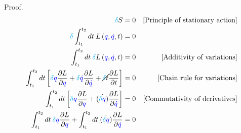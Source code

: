 \documentclass{beamer}
\begin{document}
\begin{frame}
\begin{block}{Proof.}
\begin{align*}
\textcolor{cyan}{\delta} S & = 0 & \left[ \text{Principle of stationary action} \right] \\
\textcolor{cyan}{\delta} \int_{t_1}^{t_2} dt \: L \left( \textcolor{blue}{q}, \textcolor{blue}{\dot{q}}, t \right) & = 0 \\
\int_{t_1}^{t_2} dt \: \textcolor{cyan}{\delta} L \left( \textcolor{blue}{q}, \textcolor{blue}{\dot{q}}, t \right) & = 0 & \left[ \text{Additivity of variations} \right] \\
\int_{t_1}^{t_2} dt \left[  \textcolor{cyan}{\delta} \textcolor{blue}{q} \frac{\partial L}{\partial \textcolor{blue}{q}} + \textcolor{cyan}{\delta} \textcolor{blue}{\dot{q}} \frac{\partial L}{\partial \textcolor{blue}{\dot{q}}} + \cancel{\textcolor{cyan}{\delta} t} \frac{\partial L}{\partial t} \right] & = 0 & \left[ \text{Chain rule for variations} \right] \\
\int_{t_1}^{t_2} dt \left[  \textcolor{cyan}{\delta} \textcolor{blue}{q} \frac{\partial L}{\partial \textcolor{blue}{q}} + \dot{\left( \textcolor{cyan}{\delta} \textcolor{blue}{{q}}\right)} \frac{\partial L}{\partial \textcolor{blue}{\dot{q}}} \right] & = 0 & \left[ \text{Commutativity of derivatives} \right] \\
\int_{t_1}^{t_2} dt \: \textcolor{cyan}{\delta} \textcolor{blue}{q} \frac{\partial L}{\partial \textcolor{blue}{q}} + \int_{t_1}^{t_2} dt \: \dot{\left( \textcolor{cyan}{\delta} \textcolor{blue}{{q}}\right)} \frac{\partial L}{\partial \textcolor{blue}{\dot{q}}} & = 0
\end{align*}
\end{block}
\end{frame}
\end{document}
